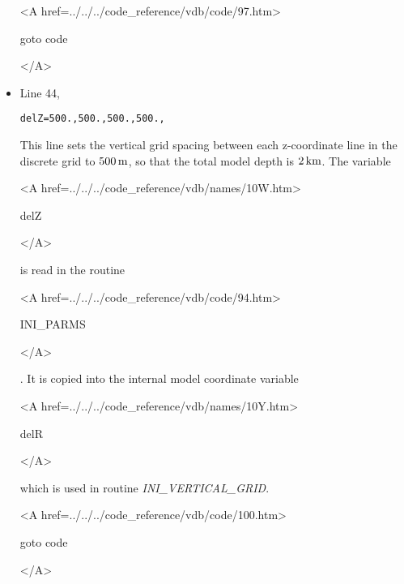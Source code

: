 \begin{itemize}
{\bf
\begin{rawhtml} <A href=../../../code_reference/vdb/code/97.htm> \end{rawhtml}
goto code
\begin{rawhtml} </A>\end{rawhtml}
}

\item Line 44,
\begin{verbatim}
delZ=500.,500.,500.,500.,
\end{verbatim}
This line sets the vertical grid spacing between each z-coordinate line
in the discrete grid to $500\,{\rm m}$, so that the total model depth 
is $2\,{\rm km}$.
The variable
{\bf
\begin{rawhtml} <A href=../../../code_reference/vdb/names/10W.htm> \end{rawhtml}
delZ
\begin{rawhtml} </A>\end{rawhtml}
}
is read in the routine
{\it
\begin{rawhtml} <A href=../../../code_reference/vdb/code/94.htm> \end{rawhtml}
INI\_PARMS
\begin{rawhtml} </A>\end{rawhtml}
}.
It is copied into the internal
model coordinate variable 
{\bf 
\begin{rawhtml} <A href=../../../code_reference/vdb/names/10Y.htm> \end{rawhtml}
delR
\begin{rawhtml} </A>\end{rawhtml}
} which is used in routine {\it INI\_VERTICAL\_GRID}.

{\bf
\begin{rawhtml} <A href=../../../code_reference/vdb/code/100.htm> \end{rawhtml}
goto code
\begin{rawhtml} </A>\end{rawhtml}
}


\end{itemize}

